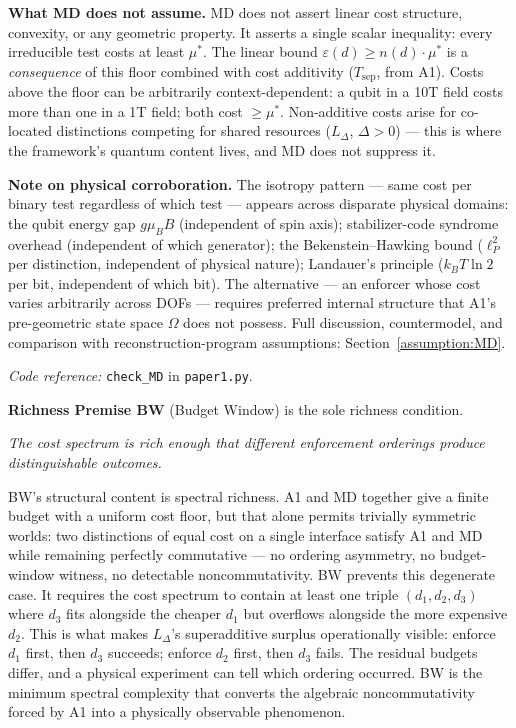 \documentclass[11pt]{article}
\theoremstyle{remark}
\newcommand{\coderef}[2]{\smallskip\noindent\textit{Code reference:} \texttt{#1} in \texttt{#2}.}
\begin{document}
\begin{tcolorbox}[defbox, title={Assumption MD (Enforcement Isotropy)}]
\smallskip\noindent\textbf{What MD does not assume.}
MD does not assert linear cost structure, convexity, or any geometric property.  It asserts a single scalar inequality: every irreducible test costs at least $\mu^*$.  The linear bound $\varepsilon(d) \ge n(d) \cdot \mu^*$ is a \emph{consequence} of this floor combined with cost additivity ($T_{\mathrm{sep}}$, from A1).  Costs above the floor can be arbitrarily context-dependent: a qubit in a 10T field costs more than one in a 1T field; both cost $\ge \mu^*$.  Non-additive costs arise for co-located distinctions competing for shared resources ($L_\Delta$, $\Delta > 0$) --- this is where the framework's quantum content lives, and MD does not suppress it.

\smallskip\noindent\textbf{Note on physical corroboration.}
The isotropy pattern --- same cost per binary test regardless of which test --- appears across disparate physical domains: the qubit energy gap $g\mu_B B$ (independent of spin axis); stabilizer-code syndrome overhead (independent of which generator); the Bekenstein--Hawking bound ($\ell_P^2$ per distinction, independent of physical nature); Landauer's principle ($k_BT\ln 2$ per bit, independent of which bit).  The alternative --- an enforcer whose cost varies arbitrarily across DOFs --- requires preferred internal structure that A1's pre-geometric state space $\Omega$ does not possess.  Full discussion, countermodel, and comparison with reconstruction-program assumptions: Section~\ref{assumption:MD}.

\coderef{check\_MD}{paper1.py}
\end{tcolorbox}

\medskip
\noindent\textbf{Richness Premise BW} (Budget Window) is the sole richness condition.

\smallskip\noindent\textit{The cost spectrum is rich enough that different enforcement orderings produce distinguishable outcomes.}

\smallskip\noindent BW's structural content is spectral richness.  A1 and MD together give a finite budget with a uniform cost floor, but that alone permits trivially symmetric worlds: two distinctions of equal cost on a single interface satisfy A1 and MD while remaining perfectly commutative --- no ordering asymmetry, no budget-window witness, no detectable noncommutativity.  BW prevents this degenerate case.  It requires the cost spectrum to contain at least one triple $(d_1, d_2, d_3)$ where $d_3$ fits alongside the cheaper $d_1$ but overflows alongside the more expensive $d_2$.  This is what makes $L_\Delta$'s superadditive surplus operationally visible: enforce $d_1$ first, then $d_3$ succeeds; enforce $d_2$ first, then $d_3$ fails.  The residual budgets differ, and a physical experiment can tell which ordering occurred.  BW is the minimum spectral complexity that converts the algebraic noncommutativity forced by A1 into a physically observable phenomenon.
\end{document}
